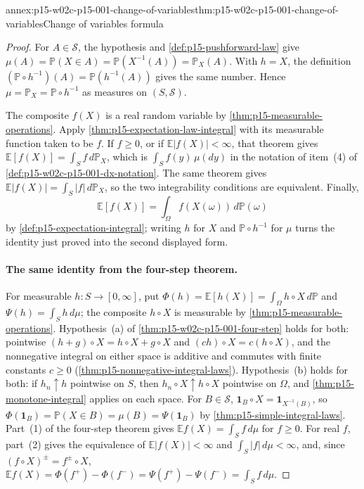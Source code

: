 \begin{annexitem}{annex:p15-w02c-p15-001-change-of-variables}{thm:p15-w02c-p15-001-change-of-variables}{Change of variables formula}
\begin{proof}
For \(A\in\mathcal S\), the hypothesis and \cref{def:p15-pushforward-law}
give \(\mu(A)=\mathbb P(X\in A)=\mathbb P(X^{-1}(A))=\mathbb P_X(A)\).
With \(h=X\), the definition
\((\mathbb P\circ h^{-1})(A)=\mathbb P(h^{-1}(A))\) gives the same
number. Hence \(\mu=\mathbb P_X=\mathbb P\circ h^{-1}\) as measures on
\((S,\mathcal S)\).

The composite \(f(X)\) is a real random variable by
\cref{thm:p15-measurable-operations}. Apply
\cref{thm:p15-expectation-law-integral} with its measurable function taken
to be \(f\). If \(f\geq0\), or if \(\mathbb E|f(X)|<\infty\), that
theorem gives \(\mathbb E[f(X)]=\int_Sf\,d\mathbb P_X\), which is
\(\int_Sf(y)\,\mu(dy)\) in the notation of item~(4) of
\cref{def:p15-w02c-p15-001-dx-notation}. The same theorem gives
\(\mathbb E|f(X)|=\int_S|f|\,d\mathbb P_X\), so the two integrability
conditions are equivalent. Finally,
\[
 \mathbb E[f(X)]=\int_\Omega f(X(\omega))\,d\mathbb P(\omega)
\]
by \cref{def:p15-expectation-integral}; writing \(h\) for \(X\) and
\(\mathbb P\circ h^{-1}\) for \(\mu\) turns the identity just proved into
the second displayed form.

\paragraph{The same identity from the four-step theorem.}
For measurable \(h:S\to[0,\infty]\), put
\(\Phi(h)=\mathbb E[h(X)]=\int_\Omega h\circ X\,d\mathbb P\) and
\(\Psi(h)=\int_Sh\,d\mu\); the composite \(h\circ X\) is measurable by
\cref{thm:p15-measurable-operations}. Hypothesis~(a) of
\cref{thm:p15-w02c-p15-001-four-step} holds for both: pointwise
\((h+g)\circ X=h\circ X+g\circ X\) and \((ch)\circ X=c(h\circ X)\), and
the nonnegative integral on either space is additive and commutes with
finite constants \(c\geq0\) (\cref{thm:p15-nonnegative-integral-laws}).
Hypothesis~(b) holds for both: if \(h_n\uparrow h\) pointwise on \(S\),
then \(h_n\circ X\uparrow h\circ X\) pointwise on \(\Omega\), and
\cref{thm:p15-monotone-integral} applies on each space. For
\(B\in\mathcal S\), \(\mathbf1_B\circ X=\mathbf1_{X^{-1}(B)}\), so
\(\Phi(\mathbf1_B)=\mathbb P(X\in B)=\mu(B)=\Psi(\mathbf1_B)\) by
\cref{thm:p15-simple-integral-laws}. Part~(1) of the four-step theorem
gives \(\mathbb E f(X)=\int_Sf\,d\mu\) for \(f\geq0\). For real \(f\),
part~(2) gives the equivalence of \(\mathbb E|f(X)|<\infty\) and
\(\int_S|f|\,d\mu<\infty\), and, since \((f\circ X)^\pm=f^\pm\circ X\),
\(\mathbb E f(X)=\Phi(f^+)-\Phi(f^-)=\Psi(f^+)-\Psi(f^-)=\int_Sf\,d\mu\).
\end{proof}
\end{annexitem}

